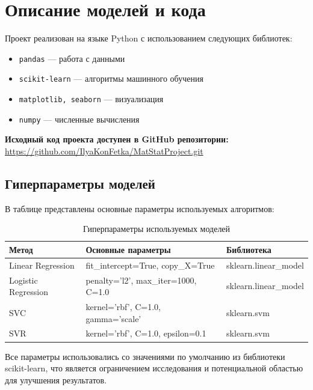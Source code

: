 \documentclass[a4paper]{article}
\begin{document}
\section{Описание моделей и кода}

Проект реализован на языке Python с использованием следующих библиотек:
\begin{itemize}
    \item \texttt{pandas} — работа с данными
    \item \texttt{scikit-learn} — алгоритмы машинного обучения
    \item \texttt{matplotlib, seaborn} — визуализация
    \item \texttt{numpy} — численные вычисления
\end{itemize}

\textbf{Исходный код проекта доступен в GitHub репозитории:}
\url{https://github.com/IlyaKonFetka/MatStatProject.git}

\subsection{Гиперпараметры моделей}

В таблице представлены основные параметры используемых алгоритмов:

\begin{table}[H]
\centering
\begin{tabular}{|l|l|l|}
\hline
\textbf{Метод} & \textbf{Основные параметры} & \textbf{Библиотека} \\
\hline
Linear Regression & fit\_intercept=True, copy\_X=True & sklearn.linear\_model \\
\hline
Logistic Regression & penalty='l2', max\_iter=1000, C=1.0 & sklearn.linear\_model \\
\hline
SVC & kernel='rbf', C=1.0, gamma='scale' & sklearn.svm \\
\hline
SVR & kernel='rbf', C=1.0, epsilon=0.1 & sklearn.svm \\
\hline
\end{tabular}
\caption{Гиперпараметры используемых моделей}
\end{table}

Все параметры использовались со значениями по умолчанию из библиотеки scikit-learn, что является ограничением исследования и потенциальной областью для улучшения результатов.
\end{document}
